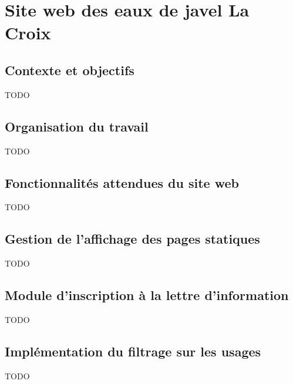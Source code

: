 \section{Site web des eaux de javel La Croix}

\subsection{Contexte et objectifs}

TODO

\subsection{Organisation du travail}

TODO

\subsection{Fonctionnalités attendues du site web}

TODO

\subsection{Gestion de l'affichage des pages statiques}

TODO

\subsection{Module d'inscription à la lettre d'information}

TODO

\subsection{Implémentation du filtrage sur les usages}

TODO
